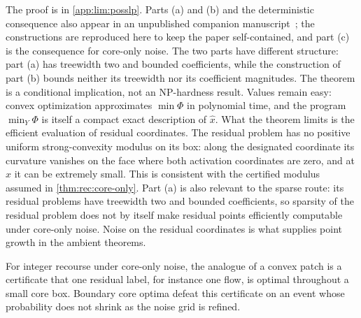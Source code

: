 The proof is in \cref{app:lim:posslp}. Parts (a) and (b) and the
deterministic consequence also appear in an unpublished companion
manuscript~\citep{companion-exact-arithmetic}; the constructions are
reproduced here to keep the paper self-contained, and part (c) is the
consequence for core-only noise. The two parts have different structure:
part (a) has treewidth two and bounded coefficients, while the construction
of part (b) bounds neither its treewidth nor its coefficient magnitudes. The
theorem is a conditional implication, not an NP-hardness result. Values
remain easy: convex optimization approximates $\min\Phi$ in polynomial time,
and the program $\min_Y\Phi$ is itself a compact exact description of
$\hat x$. What the theorem limits is the efficient evaluation of residual
coordinates. The residual problem has no positive uniform strong-convexity
modulus on its box: along the designated coordinate its curvature vanishes
on the face where both activation coordinates are zero, and at $\hat x$ it
can be extremely small. This is consistent with the certified modulus
assumed in \cref{thm:rec:core-only}. Part (a) is also relevant to the sparse
route: its residual problems have treewidth two and bounded coefficients,
so sparsity of the residual problem does not by itself make residual points
efficiently computable under core-only noise. Noise on the residual
coordinates is what supplies point growth in the ambient theorems.

For integer recourse under core-only noise, the analogue of a convex patch
is a certificate that one residual label, for instance one flow, is optimal
throughout a small core box. Boundary core optima defeat this certificate on
an event whose probability does not shrink as the noise grid is refined.

